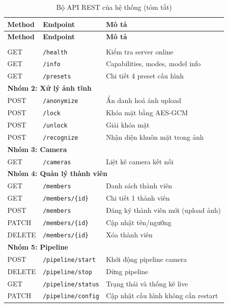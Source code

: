 \begin{longtable}{|p{}|p{}|p{}|}
\caption{Bộ API REST của hệ thống (tóm tắt)}
\label{tab:api} \\
\hline
\textbf{Method} & \textbf{Endpoint} & \textbf{Mô tả} \\
\hline
\endfirsthead
\hline
\textbf{Method} & \textbf{Endpoint} & \textbf{Mô tả} \\
\hline
\endhead
\hline
\endfoot
\multicolumn{3}{|l|}{\textbf{Nhóm 1: Health \& Info}} \\
\hline
GET & \texttt{/health} & Kiểm tra server online \\
GET & \texttt{/info} & Capabilities, modes, model info \\
GET & \texttt{/presets} & Chi tiết 4 preset cấu hình \\
\hline
\multicolumn{3}{|l|}{\textbf{Nhóm 2: Xử lý ảnh tĩnh}} \\
\hline
POST & \texttt{/anonymize} & Ẩn danh hoá ảnh upload \\
POST & \texttt{/lock} & Khóa mặt bằng AES-GCM \\
POST & \texttt{/unlock} & Giải khóa mặt \\
POST & \texttt{/recognize} & Nhận diện khuôn mặt trong ảnh \\
\hline
\multicolumn{3}{|l|}{\textbf{Nhóm 3: Camera}} \\
\hline
GET & \texttt{/cameras} & Liệt kê camera kết nối \\
\hline
\multicolumn{3}{|l|}{\textbf{Nhóm 4: Quản lý thành viên}} \\
\hline
GET & \texttt{/members} & Danh sách thành viên \\
GET & \texttt{/members/\{id\}} & Chi tiết 1 thành viên \\
POST & \texttt{/members} & Đăng ký thành viên mới (upload ảnh) \\
PATCH & \texttt{/members/\{id\}} & Cập nhật tên/ngưỡng \\
DELETE & \texttt{/members/\{id\}} & Xóa thành viên \\
\hline
\multicolumn{3}{|l|}{\textbf{Nhóm 5: Pipeline}} \\
\hline
POST & \texttt{/pipeline/start} & Khởi động pipeline camera \\
DELETE & \texttt{/pipeline/stop} & Dừng pipeline \\
GET & \texttt{/pipeline/status} & Trạng thái và thống kê live \\
PATCH & \texttt{/pipeline/config} & Cập nhật cấu hình không cần restart \\

\end{longtable}
